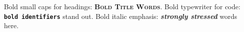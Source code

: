 \documentclass{article}
\begin{document}
Bold small caps for headings: \textsc{\textbf{Bold Title Words}}.
Bold typewriter for code: \texttt{\textbf{bold identifiers}} stand out.
Bold italic emphasis: \textit{\textbf{strongly stressed}} words here.
\end{document}
